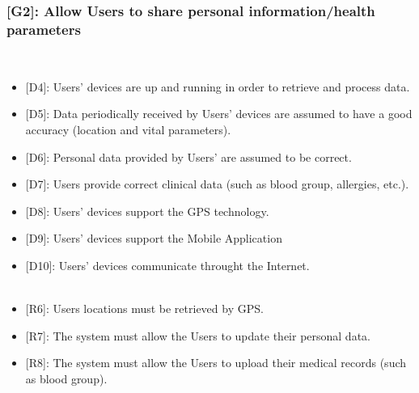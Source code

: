 \documentclass[12pt,a4paper]{article}
\begin{document}
	\subsubsection*{{[}{G2}{]}: Allow Users to share personal information/health parameters}
	\begin{itemize}\\
		\begin{itemize}
			\item {[D4]}: Users' devices are up and running in order to retrieve and process data.
			\item {[D5]}: Data periodically received by Users' devices are assumed to have a good accuracy (location and vital parameters).
			\item {[D6]}: Personal data provided by Users' are assumed to be correct.
			\item {[D7]}: Users provide correct clinical data (such as blood group, allergies, etc.).
			\item {[D8]}: Users' devices support the GPS technology.
			\item {[D9]}: Users' devices support the Mobile Application
			\item {[D10]}: Users' devices communicate throught the Internet.
			\\ \\
			\item {[R6]}: Users locations must be retrieved by GPS.
			\item {[R7]}: The system must allow the Users to update their personal data.
			\item {[R8]}: The system must allow the Users to upload their medical records (such as blood group).
		\end{itemize}
	\end{itemize}
\end{document}
